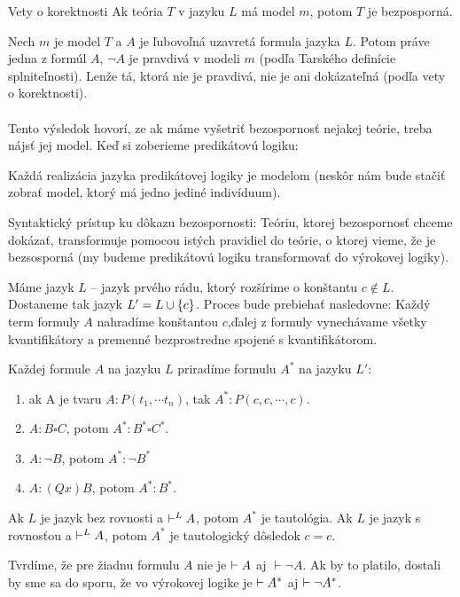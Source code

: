 \begin{dosledok}{Vety o korektnosti}
    Ak teória $T$ v jazyku $L$ má model $m$, potom $T$ je
    bezposporná.
\end{dosledok}
\begin{dokaz}
    Nech $m$ je model $T$ a $A$ je ľubovoľná uzavretá formula jazyka $L$.
    Potom práve jedna z formúl $A$, $\neg A$ je pravdivá v modeli $m$
    (podľa Tarského definície splniteľnosti).
    Lenže tá, ktorá nie je pravdivá, nie je ani dokázateľná 
    (podľa vety o korektnosti).
\end{dokaz}

\paragraph{}
\par Tento výsledok hovorí, ze ak máme vyšetriť bezospornosť nejakej teórie,
treba nájsť jej model. Keď si zoberieme predikátovú logiku:

\par Každá realizácia jazyka predikátovej logiky je modelom (neskôr nám bude
stačiť zobrať model, ktorý má jedno jediné indivíduum).

\par
Syntaktický prístup ku dôkazu bezospornosti: Teóriu, ktorej bezospornosť chceme
dokázať, transformuje pomocou istých pravidiel do teórie, o ktorej vieme, že je
bezsosporná  (my budeme predikátovú logiku transformovať do výrokovej logiky).

\begin{priklad}
    Máme jazyk $L$ -- jazyk prvého rádu, ktorý rozšírime o konštantu $c \notin L$.
    Dostaneme tak jazyk $L' = L \cup \{c\}$.
    Proces \fixme{} bude prebiehať nasledovne:
    Každý term formuly $A$ nahradíme konštantou $c$,ďalej  z formuly
    vynechávame všetky kvantifikátory a premenné bezprostredne spojené s
    kvantifikátorom.

    Každej formule $A$ na jazyku $L$ priradíme formulu $A^*$ na jazyku $L'$:
    \begin{enumerate}
            \item ak A je tvaru $A: P(t_1, \cdots t_n)$, tak $A^*: P(c, c, \cdots,c)$.
            \item $A: B \square C$, potom $A^*: B^* \square C^*$.
            \item $A: \neg B$, potom $A^*: \neg B^*$
            \item $A: (Qx) B$, potom $A^*: B^*$.
    \end{enumerate}

Ak $L$ je jazyk bez rovnosti a $\vdash^L A$, potom $A^*$ je tautológia. Ak $L$
je jazyk s rovnosťou a $\vdash^L A$, potom $A^*$ je tautologický dôsledok $c=c$.

\par Tvrdíme, že pre žiadnu formulu $A$ nie je $\vdash A$ aj $\vdash \neg A$. Ak
by to platilo, dostali by sme sa do sporu, že vo výrokovej logike je $\vdash
A^*$ aj $\vdash \neg A^*$.
\end{priklad}

\stopFIXME
